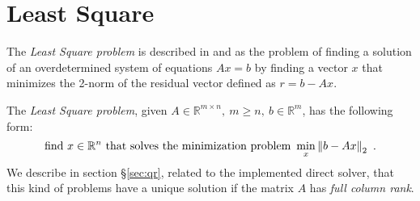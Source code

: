 \section{Least Square}
\label{sec:ls}
The \textit{Least Square problem} is described in \parencite[Lecture 11]{Bau} and \parencite[Chap. 3]{elden} as the problem of finding a solution of an overdetermined system of equations $Ax = b$ by finding a vector $x$ that minimizes the 2-norm of the residual vector defined as $r = b - Ax$.

The \textit{Least Square problem}, given $A\in\mathbb{R}^{m\times n},\ m\geq n,\ b\in\mathbb{R}^m$, has the following form:
\begin{equation}
    \label{eq:ls}
    \text{find}\ x\in\mathbb{R}^n\ \text{that solves the minimization problem}\ \min_{x}\left\lVert b - Ax \right\rVert_2\ \text{.}
\end{equation}
We describe in section \S\ref{sec:qr}, related to the implemented direct solver, that this kind of problems have a unique solution if the matrix $A$ has \textit{full column rank}.